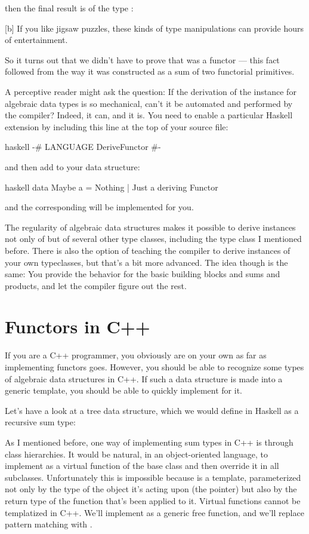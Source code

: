then the final result is of the type
:

[b]
If you like jigsaw puzzles, these kinds of type manipulations can
provide hours of entertainment.

So it turns out that we didn't have to prove that  was a
functor --- this fact followed from the way it was constructed as a sum
of two functorial primitives.

A perceptive reader might ask the question: If the derivation of the
 instance for algebraic data types is so mechanical,
can't it be automated and performed by the compiler? Indeed, it can, and
it is. You need to enable a particular Haskell extension by including
this line at the top of your source file:

\begin{snip}{haskell}
{-# LANGUAGE DeriveFunctor #-}
\end{snip}
and then add  to your data structure:

\begin{snip}{haskell}
data Maybe a = Nothing | Just a deriving Functor
\end{snip}
and the corresponding  will be implemented for you.

The regularity of algebraic data structures makes it possible to derive
instances not only of  but of several other type
classes, including the  type class I mentioned before. There
is also the option of teaching the compiler to derive instances of your
own typeclasses, but that's a bit more advanced. The idea though is the
same: You provide the behavior for the basic building blocks and sums
and products, and let the compiler figure out the rest.

\section{Functors in C++}

If you are a C++ programmer, you obviously are on your own as far as
implementing functors goes. However, you should be able to recognize
some types of algebraic data structures in C++. If such a data structure
is made into a generic template, you should be able to quickly implement
 for it.

Let's have a look at a tree data structure, which we would define in
Haskell as a recursive sum type:

As I mentioned before, one way of implementing sum types in C++ is
through class hierarchies. It would be natural, in an object-oriented
language, to implement  as a virtual function of the base
class  and then override it in all subclasses.
Unfortunately this is impossible because  is a template,
parameterized not only by the type of the object it's acting upon (the
 pointer) but also by the return type of the function
that's been applied to it. Virtual functions cannot be templatized in
C++. We'll implement  as a generic free function, and we'll
replace pattern matching with .

